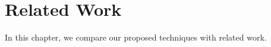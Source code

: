 \chapter{Related Work\label{chap:relatedwork}}

In this chapter, we compare our proposed techniques with related work.

\lipsum{}

